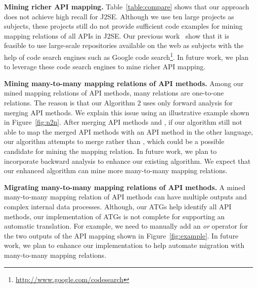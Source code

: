 \textbf{Mining richer API mapping.} Table~\ref{table:compare} shows
that our approach does not achieve high recall for J2SE. Although we
use ten large projects as subjects, these projects still do not
provide sufficient code examples for mining mapping relations of all
APIs in J2SE. Our previous
work~\cite{thummalapenta07parseweb,thummalapentaase08spotweb} show
that it is feasible to use large-scale repositories available on the
web as subjects with the help of code search engines such as Google
code search\footnote{\url{http://www.google.com/codesearch}}. In
future work, we plan to leverage these code search engines to mine
richer API mapping.


\textbf{Mining many-to-many mapping relations of API methods.} Among
our mined mapping relations of API methods, many relations are
one-to-one relations. The reason is that our Algorithm 2 uses only
forward analysis for merging API methods. We explain this issue
using an illustrative example shown in Figure~\ref{fig:n2n}. After
merging API methods  and , if our
algorithm still not able to map the merged API methods with an API
method in the other language, our algorithm attempts to merge
 rather than , which could be a
possible candidate for mining the mapping relation. In future work,
we plan to incorporate backward analysis to enhance our existing
algorithm. We expect that our enhanced algorithm can mine more
many-to-many mapping relations.

\textbf{Migrating many-to-many mapping relations of API methods.}
A mined many-to-many mapping relation of API methods can have multiple outputs
and complex internal data processes. Although, our ATGs
help identify all API methods, our implementation of ATGs is not complete
for supporting an automatic translation. For example, we need to manually add an
\emph{or} operator for the two outputs of the API mapping shown in
Figure~\ref{fig:example}. In future work, we plan to enhance our implementation to help
automate migration with many-to-many mapping relations.

